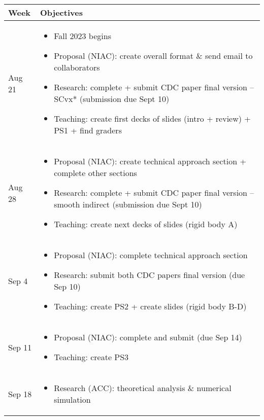 \documentclass{article}
\begin{document}
\begin{center}
\begin{xltabular}{\linewidth}{ s | M } 
Week 	& Objectives \\
\hline
Aug 21 	&
\begin{itemize}
\item 
Fall 2023 begins
\item 
Proposal (NIAC): create overall format \& send email to collaborators
\item 
Research: complete + submit CDC paper final version -- SCvx* (submission due Sept 10)
\item 
Teaching: create first decks of slides (intro + review) + PS1 + find graders
\end{itemize}
\\
\hline
Aug 28 	&
\begin{itemize}
\item 
Proposal (NIAC): create technical approach section + complete other sections
\item 
Research: complete + submit CDC paper final version -- smooth indirect (submission due Sept 10)
\item 
Teaching: create next decks of slides (rigid body A)
\end{itemize}
\\
\hline
Sep 4 	&
\begin{itemize}
\item 
Proposal (NIAC): complete technical approach section
\item 
Research: submit both CDC papers final version (due Sep 10)
\item 
Teaching: create PS2 + create slides (rigid body B-D)
\end{itemize}
\\
\hline
Sep 11 	&
\begin{itemize}
\item 
Proposal (NIAC): complete and submit (due Sep 14)
\item 
Teaching: create PS3
\end{itemize}
\\
\hline
Sep 18 	&
\begin{itemize}
\item 
Research (ACC): theoretical analysis \& numerical simulation

\end{itemize}
\end{xltabular}
\end{center}
\end{document}
